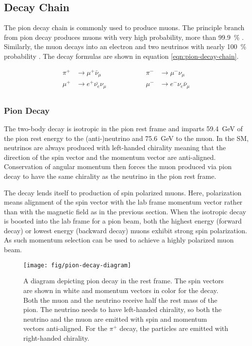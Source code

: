 \subsection{Decay Chain}

The pion decay chain is commonly used to produce muons.  The principle branch from pion decay produces muons with very high probability, more than \SI{99.9}{\percent} \cite{pdg-2016}.  Similarly, the muon decays into an electron and two neutrinos with nearly \SI{100}{\percent} probability \cite{pdg-2016}.  The decay formulas are shown in equation \ref{eqn:pion-decay-chain}.

\begin{equation}
\label{eqn:pion-decay-chain}
\begin{aligned}
\pi^+ & \rightarrow \mu^+ \bar{\nu}_\mu  \hspace{5em} & \pi^- & \rightarrow \mu^- \nu_\mu \\
\mu^+ & \rightarrow e^+ \bar{\nu_e} \nu_\mu  \hspace{5em} & \mu^- & \rightarrow e^- \nu_e \bar{\nu}_\mu\\
\end{aligned}
\end{equation}

\subsubsection{Pion Decay}

The two-body decay is isotropic in the pion rest frame and imparts \SI{59.4}{\GeV} of the pion rest energy to the (anti-)neutrino and \SI{75.6}{\GeV} to the muon.  In the SM, neutrinos are always produced with left-handed chirality meaning that the direction of the spin vector and the momentum vector are anti-aligned.  Conservation of angular momentum then forces the muon produced via pion decay to have the same chirality as the neutrino in the pion rest frame.  

The decay lends itself to production of spin polarized muons.  Here, polarization means alignment of the spin vector with the lab frame momentum vector rather than with the magnetic field as in the previous section.  When the isotropic decay is boosted into the lab frame for a pion beam, both the highest energy (forward decay) or lowest energy (backward decay) muons exhibit strong spin polarization.  As such momentum selection can be used to achieve a highly polarized muon beam. 

\begin{figure}
\centering
\texttt{[image: fig/pion-decay-diagram]}
\caption{
    A diagram depicting pion decay in the rest frame.  The spin vectors are shown in white and momentum vectors in color for the decay.  Both the muon and the neutrino receive half the rest mass of the pion.  The neutrino needs to have left-handed chirality, so both the neutrino and the muon are emitted with spin and momentum vectors anti-aligned.  For the $\pi^+$ decay, the particles are emitted with right-handed chirality.
    \label{fig:muon-decay-diagram}
}
\end{figure}

